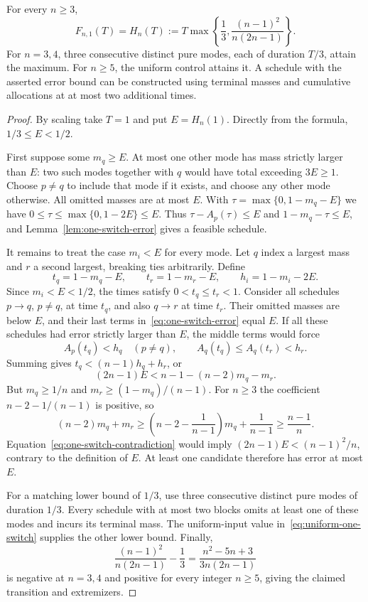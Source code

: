 \begin{theorem}\label{thm:one-switch}
For every $n\ge3$,
\begin{equation}\label{eq:one-switch-minimax}
 F_{n,1}(T)=H_n(T):=
 T\max\left\{\frac13,\frac{(n-1)^2}{n(2n-1)}\right\}.
\end{equation}
For $n=3,4$, three consecutive distinct pure modes, each of duration $T/3$,
attain the maximum. For $n\ge5$, the uniform control attains it. A schedule
with the asserted error bound can be constructed using terminal masses and
cumulative allocations at at most two additional times.
\end{theorem}
\begin{proof}
By scaling take $T=1$ and put $E=H_n(1)$. Directly from the formula,
$1/3\le E<1/2$.

First suppose some $m_q\ge E$. At most one other mode has mass strictly
larger than $E$: two such modes together with $q$ would have total exceeding
$3E\ge1$. Choose $p\ne q$ to include that mode if it exists, and choose any
other mode otherwise. All omitted masses are at most $E$. With
$\tau=\max\{0,1-m_q-E\}$ we have
$0\le\tau\le\max\{0,1-2E\}\le E$. Thus
$\tau-A_p(\tau)\le E$ and $1-m_q-\tau\le E$, and
Lemma~\ref{lem:one-switch-error} gives a feasible schedule.

It remains to treat the case $m_i<E$ for every mode. Let $q$ index a largest
mass and $r$ a second largest, breaking ties arbitrarily. Define
\[
 t_q=1-m_q-E,\qquad t_r=1-m_r-E,\qquad h_i=1-m_i-2E.
\]
Since $m_i<E<1/2$, the times satisfy $0<t_q\le t_r<1$.
Consider all schedules $p\to q$, $p\ne q$, at time $t_q$, and also
$q\to r$ at time $t_r$. Their omitted masses are below $E$, and their
last terms in~\eqref{eq:one-switch-error} equal $E$. If all these schedules
had error strictly larger than $E$, the middle terms would force
\[
 A_p(t_q)<h_q\quad(p\ne q),\qquad
 A_q(t_q)\le A_q(t_r)<h_r.
\]
Summing gives $t_q<(n-1)h_q+h_r$, or
\begin{equation}\label{eq:one-switch-contradiction}
 (2n-1)E<n-1-(n-2)m_q-m_r.
\end{equation}
But $m_q\ge1/n$ and $m_r\ge(1-m_q)/(n-1)$. For $n\ge3$ the coefficient
$n-2-1/(n-1)$ is positive, so
\[
 (n-2)m_q+m_r
 \ge\left(n-2-\frac1{n-1}\right)m_q+\frac1{n-1}
 \ge\frac{n-1}{n}.
\]
Equation~\eqref{eq:one-switch-contradiction} would imply
$(2n-1)E<(n-1)^2/n$, contrary to the definition of $E$. At least one
candidate therefore has error at most $E$.

For a matching lower bound of $1/3$, use three consecutive distinct pure
modes of duration $1/3$. Every schedule with at most two blocks omits at
least one of these modes and incurs its terminal mass. The uniform-input
value in~\eqref{eq:uniform-one-switch} supplies the other lower bound.
Finally,
\[
 \frac{(n-1)^2}{n(2n-1)}-\frac13
 =\frac{n^2-5n+3}{3n(2n-1)}
\]
is negative at $n=3,4$ and positive for every integer $n\ge5$, giving the
claimed transition and extremizers.
\end{proof}

